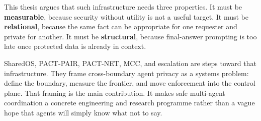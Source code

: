 This thesis argues that such infrastructure needs three properties. It must be \textbf{measurable}, because security without utility is not a useful target. It must be \textbf{relational}, because the same fact can be appropriate for one requester and private for another. It must be \textbf{structural}, because final-answer prompting is too late once protected data is already in context.

SharedOS, PACT-PAIR, PACT-NET, MCC, and escalation are steps toward that infrastructure. They frame cross-boundary agent privacy as a systems problem: define the boundary, measure the frontier, and move enforcement into the control plane. That framing is the main contribution. It makes safe multi-agent coordination a concrete engineering and research programme rather than a vague hope that agents will simply know what not to say.
